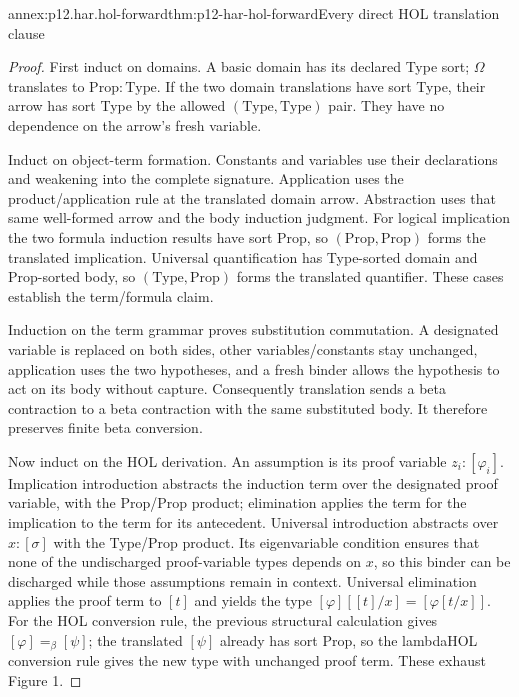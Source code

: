 \begin{annexitem}{annex:p12.har.hol-forward}{thm:p12-har-hol-forward}{Every direct HOL translation clause}
\begin{proof}
First induct on domains. A basic domain has its declared Type sort;
\(\Omega\) translates to \(\mathrm{Prop}:\mathrm{Type}\).
If the two domain translations have sort Type, their arrow has sort Type
by the allowed \((\mathrm{Type},\mathrm{Type})\) pair. They have
no dependence on the arrow's fresh variable.

Induct on object-term formation. Constants and variables use their
declarations and weakening into the complete signature. Application uses
the product/application rule at the translated domain arrow. Abstraction
uses that same well-formed arrow and the body induction judgment.
For logical implication the two formula induction results have sort Prop,
so \((\mathrm{Prop},\mathrm{Prop})\) forms the translated
implication. Universal quantification has Type-sorted domain and
Prop-sorted body, so \((\mathrm{Type},\mathrm{Prop})\) forms
the translated quantifier. These cases establish the term/formula claim.

Induction on the term grammar proves substitution commutation. A
designated variable is replaced on both sides, other variables/constants
stay unchanged, application uses the two hypotheses, and a fresh binder
allows the hypothesis to act on its body without capture. Consequently
translation sends a beta contraction to a beta contraction with the
same substituted body. It therefore preserves finite beta conversion.

Now induct on the HOL derivation. An assumption is its proof variable
\(z_i:[\varphi_i]\). Implication introduction abstracts the induction
term over the designated proof variable, with the Prop/Prop product;
elimination applies the term for the implication to the term for its
antecedent. Universal introduction abstracts over \(x:[\sigma]\)
with the Type/Prop product. Its eigenvariable condition ensures that
none of the undischarged proof-variable types depends on \(x\), so
this binder can be discharged while those assumptions remain in context.
Universal elimination applies the proof term to \([t]\) and yields
the type \([\varphi][[t]/x]=[\varphi[t/x]]\).
For the HOL conversion rule, the previous structural calculation gives
\([\varphi]=_\beta[\psi]\); the translated \([\psi]\)
already has sort Prop, so the lambdaHOL conversion rule gives the new
type with unchanged proof term. These exhaust Figure 1.
\end{proof}
\end{annexitem}


